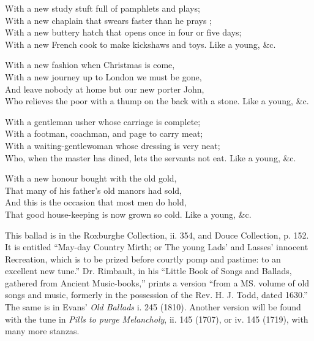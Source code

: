 \begin{dcverse}
With a new study stuft full of pamphlets and plays;\\
With a new chaplain that swears faster than he prays ;\\
With a new buttery hatch that opens once in four or five days;\\
With a new French cook to make kickshaws and toys. Like a young, \&c.

With a new fashion when Christmas is come,\\
With a new journey up to London we must be gone,\\
And leave nobody at home but our new porter John,\\
Who relieves the poor with a thump on the back with a stone. Like a young, \&c.

With a gentleman usher whose carriage is complete;\\
With a footman, coachman, and page to carry meat;\\
With a waiting-gentlewoman whose dressing is very neat;\\
Who, when the master has dined, lets the servants not eat. Like a young, \&c.
\end{dcverse}

\settowidth{\versewidth}{With a new honour bought with the old gold,}
\begin{scverse}With a new honour bought with the old gold,\\
That many of his father’s old manors had sold,\\
And this is the occasion that most men do hold,\\
That good house-keeping is now grown so cold. Like a young, \&c.
\end{scverse}


This ballad is in the Roxburghe Collection, ii. 354, and Douce Collection,
p. 152. It is entitled “May-day Country Mirth; or The young Lads’ and
Lasses’ innocent Recreation, which is to be prized before courtly pomp and pastime: 
to an excellent new tune.” Dr. Rimbault, in his “Little Book of Songs and
Ballads, gathered from Ancient Music-books,” prints a version “from a MS.
volume of old songs and music, formerly in the possession of the Rev. H. J.
Todd, dated 1630.” The same is in Evans’ \textit{Old Ballads} i. 245 (1810). Another
version will be found with the tune in \textit{ Pills to purge Melancholy}, ii. 145 (1707),
or iv. 145 (1719), with many more stanzas.
\pagebreak

